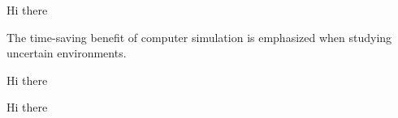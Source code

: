 \documentclass[../main.tex]{subfiles}
\begin{document}
Hi there \textcite{Zho20}

The time-saving benefit of computer simulation is emphasized 
when studying uncertain environments.

Hi there \cite{Wal19}

Hi there \cite{Gar20}



\blindtext
\end{document}
